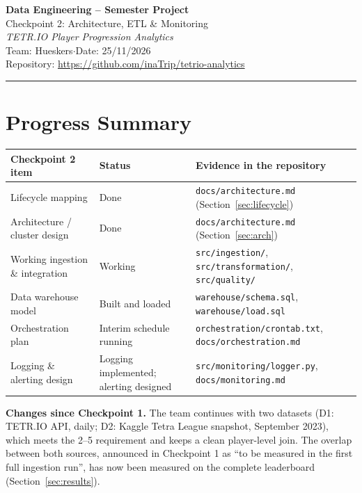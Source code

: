 \documentclass[11pt,a4paper]{article}
\newcommand{\projecttitle}{TETR.IO Player Progression Analytics}
\newcommand{\teamname}{Hueskers}
\newcommand{\submissiondate}{25/11/2026}
\newcommand{\repourl}{\url{https://github.com/inaTrip/tetrio-analytics}}
\begin{document}
\begin{center}
  {\Large\bfseries Data Engineering -- Semester Project}\\[4pt]
  {\large Checkpoint 2: Architecture, ETL \& Monitoring}\\[8pt]
  {\large\itshape \projecttitle}\\[8pt]
  Team: \teamname \quad$\cdot$\quad Date: \submissiondate\\
  Repository: \repourl
\end{center}
\vspace{2mm}\hrule\vspace{4mm}

\section{Progress Summary}
\begin{tabularx}{\textwidth}{@{}p{4.6cm}p{2.6cm}Y@{}}
\toprule
\textbf{Checkpoint 2 item} & \textbf{Status} & \textbf{Evidence in the repository} \\
\midrule
Lifecycle mapping & Done & \texttt{docs/architecture.md} (Section~\ref{sec:lifecycle}) \\
Architecture / cluster design & Done & \texttt{docs/architecture.md} (Section~\ref{sec:arch}) \\
Working ingestion \& integration & Working & \texttt{src/ingestion/}, \texttt{src/transformation/}, \texttt{src/quality/} \\
Data warehouse model & Built and loaded & \texttt{warehouse/schema.sql}, \texttt{warehouse/load.sql} \\
Orchestration plan & Interim schedule running & \texttt{orchestration/crontab.txt}, \texttt{docs/orchestration.md} \\
Logging \& alerting design & Logging implemented; alerting designed & \texttt{src/monitoring/logger.py}, \texttt{docs/monitoring.md} \\
\bottomrule
\end{tabularx}

\medskip
\noindent\textbf{Changes since Checkpoint 1.} The team continues with two
datasets (D1: TETR.IO API, daily; D2: Kaggle Tetra League snapshot,
September 2023), which meets the 2--5 requirement and keeps a clean
player-level join. The overlap between both sources, announced in
Checkpoint 1 as ``to be measured in the first full ingestion run'', has now
been measured on the complete leaderboard (Section~\ref{sec:results}).
\end{document}
